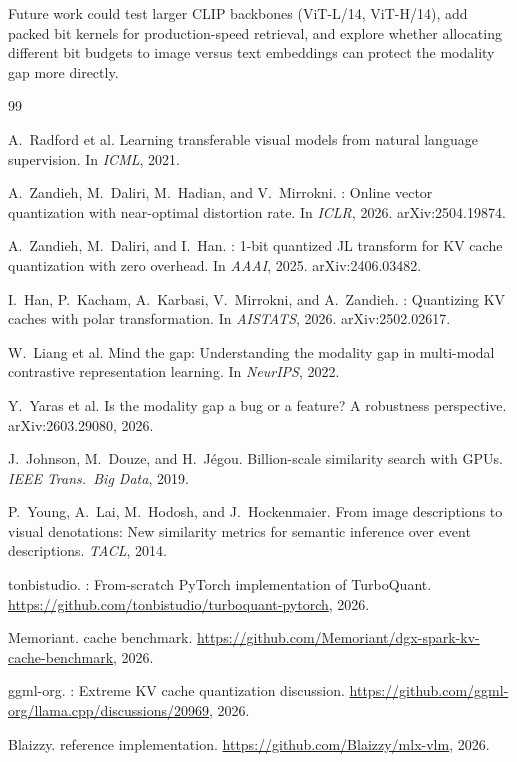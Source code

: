\documentclass[11pt]{article}
\begin{document}
Future work could test larger CLIP backbones (ViT-L/14, ViT-H/14), add packed bit kernels for
production-speed retrieval, and explore whether allocating different bit budgets to image versus text
embeddings can protect the modality gap more directly.


\begin{thebibliography}{99}

A.~Radford et al.
\newblock Learning transferable visual models from natural language supervision.
\newblock In \textit{ICML}, 2021.

A.~Zandieh, M.~Daliri, M.~Hadian, and V.~Mirrokni.
: Online vector quantization with near-optimal distortion rate.
\newblock In \textit{ICLR}, 2026. arXiv:2504.19874.

A.~Zandieh, M.~Daliri, and I.~Han.
: 1-bit quantized {JL} transform for {KV} cache quantization with zero overhead.
\newblock In \textit{AAAI}, 2025. arXiv:2406.03482.

I.~Han, P.~Kacham, A.~Karbasi, V.~Mirrokni, and A.~Zandieh.
: Quantizing {KV} caches with polar transformation.
\newblock In \textit{AISTATS}, 2026. arXiv:2502.02617.

W.~Liang et al.
\newblock Mind the gap: Understanding the modality gap in multi-modal contrastive representation learning.
\newblock In \textit{NeurIPS}, 2022.

Y.~Yaras et al.
\newblock Is the modality gap a bug or a feature? A robustness perspective.
\newblock arXiv:2603.29080, 2026.

J.~Johnson, M.~Douze, and H.~J{\'e}gou.
\newblock Billion-scale similarity search with {GPU}s.
\newblock \textit{IEEE Trans.\ Big Data}, 2019.

P.~Young, A.~Lai, M.~Hodosh, and J.~Hockenmaier.
\newblock From image descriptions to visual denotations: New similarity metrics for semantic inference over event descriptions.
\newblock \textit{TACL}, 2014.

tonbistudio.
: From-scratch {PyTorch} implementation of {TurboQuant}.
\newblock \url{https://github.com/tonbistudio/turboquant-pytorch}, 2026.

Memoriant.
 cache benchmark.
\newblock \url{https://github.com/Memoriant/dgx-spark-kv-cache-benchmark}, 2026.

ggml-org.
: Extreme {KV} cache quantization discussion.
\newblock \url{https://github.com/ggml-org/llama.cpp/discussions/20969}, 2026.

Blaizzy.
 reference implementation.
\newblock \url{https://github.com/Blaizzy/mlx-vlm}, 2026.

\end{thebibliography}
\end{document}
